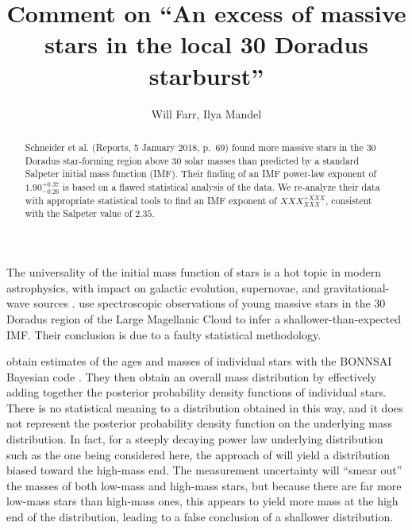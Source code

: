 \documentclass[apjl]{emulateapj}
\begin{document}
\title{Comment on ``An excess of massive stars in the local 30 Doradus starburst''}

\author{Will Farr, Ilya Mandel}

\begin{abstract}
Schneider et al. (Reports, 5 January 2018, p.~69) found more massive stars in the 30 Doradus star-forming region above 30 solar masses than predicted by a standard Salpeter initial mass function (IMF).  Their finding of an IMF power-law exponent of $1.90^{+0.37}_{-0.26}$ is based on a flawed statistical analysis of the data.  We re-analyze their data with appropriate statistical tools to find an IMF exponent of $XXX^{+XXX}_{XXX}$, consistent with the Salpeter value of $2.35$.
\end{abstract}

\maketitle

The universality of the initial mass function of stars is a hot topic in modern astrophysics, with impact on galactic evolution, supernovae, and gravitational-wave sources \cite{Kroupa:review,Bastian:2010}.    \citet{Schneider:2018} use spectroscopic observations of young massive stars in the 30 Doradus region of the Large Magellanic Cloud to infer a shallower-than-expected IMF.  Their conclusion is due to a faulty statistical methodology.

\citet{Schneider:2018} obtain estimates of the ages and masses of individual stars with the BONNSAI Bayesian code \cite{Schneider:Bonn}.  They then obtain an overall mass distribution by effectively adding together the posterior probability density functions of individual stars.  There is no statistical meaning to a distribution obtained in this way, and it does not represent the posterior probability density function on the underlying mass distribution.  In fact, for a steeply decaying power law underlying distribution such as the one being considered here, the approach of \cite{Schneider:2018} will yield a distribution biased toward the high-mass end.  The measurement uncertainty will ``smear out'' the masses of both low-mass and high-mass stars, but because there are far more low-mass stars than high-mass ones, this appears to yield more mass at the high end of the distribution, leading to a false conclusion of a shallower distribution.  
\end{document}

